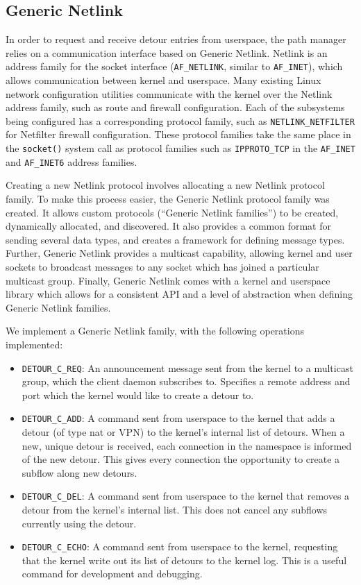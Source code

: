 \documentclass{cwru}
\begin{document}
\subsection{Generic Netlink}
\label{s:genl}

In order to request and receive detour entries from userspace, the path manager
relies on a communication interface based on Generic Netlink. Netlink is an
address family for the socket interface (\texttt{AF\_NETLINK}, similar to
\texttt{AF\_INET}), which allows communication between kernel and userspace.
Many existing Linux network configuration utilities communicate with the kernel
over the Netlink address family, such as route and firewall configuration. Each
of the subsystems being configured has a corresponding protocol family, such as
\texttt{NETLINK\_NETFILTER} for Netfilter firewall configuration. These protocol
families take the same place in the \texttt{socket()} system call as protocol
families such as \texttt{IPPROTO\_TCP} in the \texttt{AF\_INET} and
\texttt{AF\_INET6} address families.

Creating a new Netlink protocol involves allocating a new Netlink protocol
family. To make this process easier, the Generic Netlink protocol family was
created. It allows custom protocols (``Generic Netlink families'') to be
created, dynamically allocated, and discovered. It also provides a common format
for sending several data types, and creates a framework for defining message
types. Further, Generic Netlink provides a multicast capability, allowing kernel
and user sockets to broadcast messages to any socket which has joined a
particular multicast group. Finally, Generic Netlink comes with a kernel and
userspace library which allows for a consistent API and a level of abstraction
when defining Generic Netlink families.

We implement a Generic Netlink family, with the following operations
implemented:

\begin{itemize}
\item \texttt{DETOUR\_C\_REQ}: An announcement message sent from the kernel to a
  multicast group, which the client daemon subscribes to. Specifies a remote
  address and port which the kernel would like to create a detour to.
\item \texttt{DETOUR\_C\_ADD}: A command sent from userspace to the kernel that
  adds a detour (of type \ac{nat} or VPN) to the kernel's internal list of
  detours. When a new, unique detour is received, each connection in the
  namespace is informed of the new detour. This gives every connection the
  opportunity to create a subflow along new detours.
\item \texttt{DETOUR\_C\_DEL}: A command sent from userspace to the kernel that
  removes a detour from the kernel's internal list. This does not cancel any
  subflows currently using the detour.
\item \texttt{DETOUR\_C\_ECHO}: A command sent from userspace to the kernel,
  requesting that the kernel write out its list of detours to the kernel log.
  This is a useful command for development and debugging.
\end{itemize}
\end{document}
